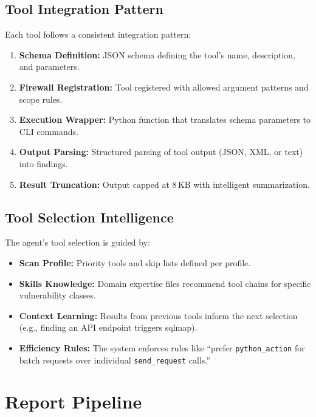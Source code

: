 \documentclass[12pt,a4paper,twoside]{report}
\begin{document}
\section{Tool Integration Pattern}

Each tool follows a consistent integration pattern:

\begin{enumerate}
    \item \textbf{Schema Definition:} JSON schema defining the tool's name, description, and parameters.
    \item \textbf{Firewall Registration:} Tool registered with allowed argument patterns and scope rules.
    \item \textbf{Execution Wrapper:} Python function that translates schema parameters to CLI commands.
    \item \textbf{Output Parsing:} Structured parsing of tool output (JSON, XML, or text) into findings.
    \item \textbf{Result Truncation:} Output capped at 8\,KB with intelligent summarization.
\end{enumerate}

\section{Tool Selection Intelligence}

The agent's tool selection is guided by:
\begin{itemize}
    \item \textbf{Scan Profile:} Priority tools and skip lists defined per profile.
    \item \textbf{Skills Knowledge:} Domain expertise files recommend tool chains for specific vulnerability classes.
    \item \textbf{Context Learning:} Results from previous tools inform the next selection (e.g., finding an API endpoint triggers sqlmap).
    \item \textbf{Efficiency Rules:} The system enforces rules like ``prefer \texttt{python\_action} for batch requests over individual \texttt{send\_request} calls.''
\end{itemize}


\chapter{Report Pipeline}
\label{ch:reports}
\end{document}
